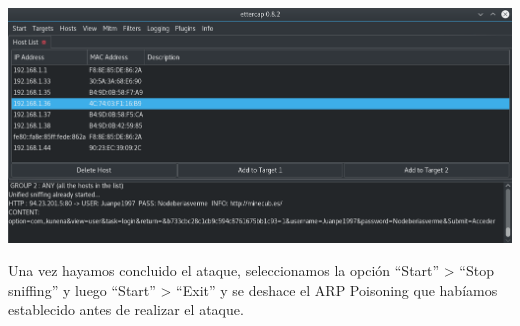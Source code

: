 \begin{enumerate}
	\begin{center}
		\includegraphics[scale=0.38]{e5.png}
	\end{center}
\end{enumerate}

Una vez hayamos concluido el ataque, seleccionamos la opción ``Start'' > ``Stop sniffing'' y luego ``Start'' > ``Exit'' y se deshace el ARP Poisoning que habíamos establecido antes de realizar el ataque.